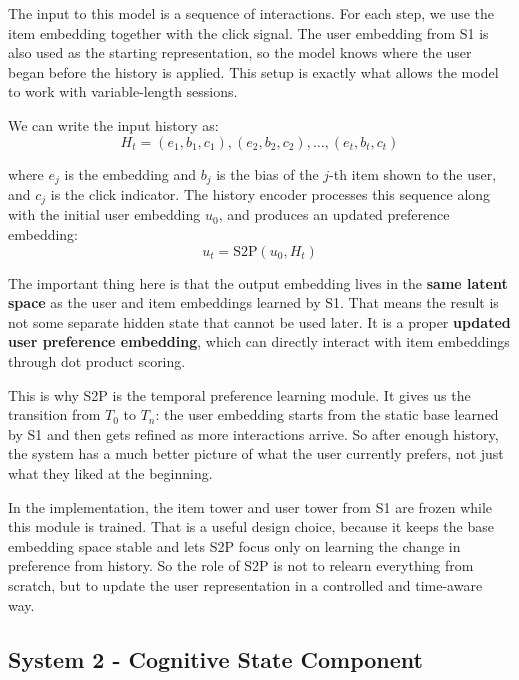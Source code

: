 The input to this model is a sequence of interactions. 
For each step, we use the item embedding together with the click signal. 
The user embedding from S1 is also used as the starting representation, so the model knows where the user began before the history is applied.
This setup is exactly what allows the model to work with variable-length sessions.

We can write the input history as:
\begin{equation}
    H_t = {(e_1, b_1, c_1), (e_2, b_2, c_2), \dots, (e_t, b_t, c_t)}
\end{equation}

where $e_j$ is the embedding and $b_j$ is the bias of the $j$-th item shown to the user, and $c_j$ is the click indicator. 
The history encoder processes this sequence along with the initial user embedding $u_0$, and produces an updated preference embedding:
\begin{equation}
    u_t = \text{S2P}(u_0, H_t)
\end{equation}

The important thing here is that the output embedding lives in the \textbf{same latent space} as the user and item embeddings learned by S1. 
That means the result is not some separate hidden state that cannot be used later. 
It is a proper \textbf{updated user preference embedding}, which can directly interact with item embeddings through dot product scoring.

This is why S2P is the temporal preference learning module. 
It gives us the transition from $T_0$ to $T_n$: the user embedding starts from the static base learned by S1 and then gets refined as more interactions arrive. 
So after enough history, the system has a much better picture of what the user currently prefers, not just what they liked at the beginning.

In the implementation, the item tower and user tower from S1 are frozen while this module is trained.
That is a useful design choice, because it keeps the base embedding space stable and lets S2P focus only on learning the change in preference from history.
So the role of S2P is not to relearn everything from scratch, but to update the user representation in a controlled and time-aware way.



\subsection{System 2 - Cognitive State Component}

